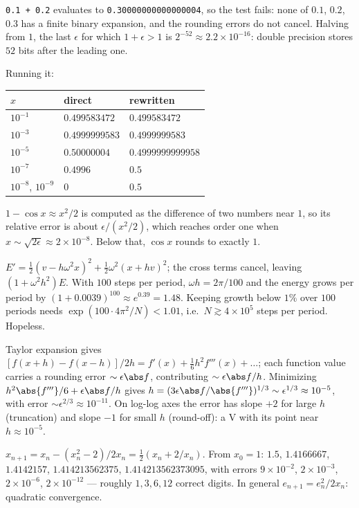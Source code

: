
 \texttt{0.1 + 0.2} evaluates to \texttt{0.30000000000000004}, so the test fails: none of $0.1$, $0.2$, $0.3$ has a finite binary expansion, and the rounding errors do not cancel. Halving from $1$, the last $\epsilon$ for which $1+\epsilon>1$ is $2^{-52}\approx2.2\times10^{-16}$: double precision stores $52$ bits after the leading one.

 Running it:
\begin{center}
\small
\begin{tabular}{@{}lll@{}}
\toprule
$x$ & direct & rewritten\\
\midrule
$10^{-1}$ & $0.499583472$ & $0.499583472$\\
$10^{-3}$ & $0.4999999583$ & $0.4999999583$\\
$10^{-5}$ & $0.50000004$ & $0.4999999999958$\\
$10^{-7}$ & $0.4996$ & $0.5$\\
$10^{-8}$, $10^{-9}$ & $0$ & $0.5$\\
\bottomrule
\end{tabular}
\end{center}
$1-\cos x\approx x^2/2$ is computed as the difference of two numbers near $1$, so its relative error is about $\epsilon/(x^2/2)$, which reaches order one when $x\sim\sqrt{2\epsilon}\approx2\times10^{-8}$. Below that, $\cos x$ rounds to exactly $1$.

 $E' = \tfrac12(v - h\omega^2x)^2 + \tfrac12\omega^2(x + hv)^2$; the cross terms cancel, leaving $(1+\omega^2h^2)E$. With $100$ steps per period, $\omega h = 2\pi/100$ and the energy grows per period by $(1+0.0039)^{100}\approx e^{0.39} = 1.48$. Keeping growth below $1\%$ over $100$ periods needs $\exp(100\cdot4\pi^2/N)<1.01$, i.e.\ $N\gtrsim4\times10^5$ steps per period. Hopeless.

 Taylor expansion gives $[f(x+h)-f(x-h)]/2h = f'(x) + \tfrac16h^2f'''(x) + \dots$; each function value carries a rounding error $\sim\epsilon\abs f$, contributing $\sim\epsilon\abs f/h$. Minimizing $h^2\abs{f'''}/6 + \epsilon\abs f/h$ gives $h = (3\epsilon\abs f/\abs{f'''})^{1/3}\sim\epsilon^{1/3}\approx10^{-5}$, with error $\sim\epsilon^{2/3}\approx10^{-11}$. On log-log axes the error has slope $+2$ for large $h$ (truncation) and slope $-1$ for small $h$ (round-off): a V with its point near $h\approx10^{-5}$.

 $x_{n+1} = x_n - (x_n^2-2)/2x_n = \tfrac12(x_n+2/x_n)$. From $x_0 = 1$: $1.5$, $1.4166667$, $1.4142157$, $1.414213562375$, $1.414213562373095$, with errors $9\times10^{-2}$, $2\times10^{-3}$, $2\times10^{-6}$, $2\times10^{-12}$ --- roughly $1, 3, 6, 12$ correct digits. In general $e_{n+1} = e_n^2/2x_n$: quadratic convergence.

